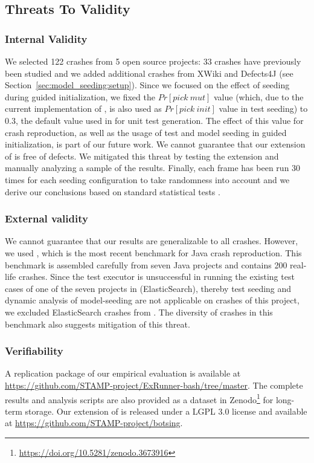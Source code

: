 
\subsection{Threats To Validity}\label{sec:model_seeding:ttvalidity}

\subsubsection{Internal Validity}
We selected 122 crashes from 5 open source projects: 33 crashes have previously been studied \cite{Soltani2018b} and we added additional crashes from XWiki and Defects4J (see Section~\ref{sec:model_seeding:setup}). 
%
Since we focused on the effect of seeding during guided initialization, we fixed the $Pr[pick\ mut]$ value (which, due to the current implementation of \botsing, is also used as $Pr[pick\ init]$ value in test seeding) to 0.3, the default value used in \evosuite for unit test generation. The effect of this value for crash reproduction, as well as the usage of test and model seeding in guided initialization, is part of our future work.
%
We cannot guarantee that our extension of \botsing is free of defects. We mitigated this threat by testing the extension and manually analyzing a sample of the results.
%
Finally, each frame has been run 30 times for each seeding configuration to take randomness into account and we derive our conclusions based on standard statistical tests \cite{Arcuri2014,Panichella2017c}.

\subsubsection{External validity}
We cannot guarantee that our results are generalizable to all crashes. However, we used \jcrashpack, which is the most recent benchmark for Java crash reproduction. This benchmark is assembled carefully from seven Java projects and contains 200 real-life crashes. Since the \evosuite test executor is unsuccessful in running the existing test cases of one of the seven projects in \jcrashpack (ElasticSearch), thereby test seeding and dynamic analysis of model-seeding are not applicable on crashes of this project, we excluded ElasticSearch crashes from \jcrashpack. The diversity of crashes in this benchmark also suggests mitigation of this threat.

\subsubsection{Verifiability} 
A replication package of our empirical evaluation is available at \url{https://github.com/STAMP-project/ExRunner-bash/tree/master}. The complete results and analysis scripts are also provided as a dataset in Zenodo\footnote{\url{https://doi.org/10.5281/zenodo.3673916}} for long-term storage. Our extension of \botsing is released under a LGPL 3.0 license and available at \url{https://github.com/STAMP-project/botsing}.




